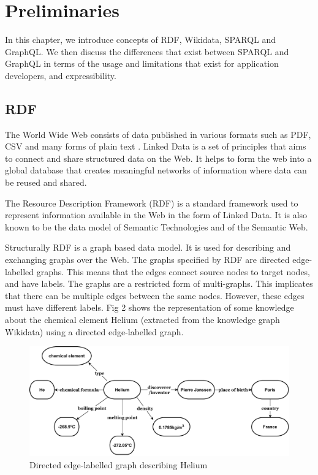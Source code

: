 \chapter{Preliminaries}
In this chapter, we introduce concepts of RDF, Wikidata, SPARQL and GraphQL. We then discuss the differences that exist between SPARQL and GraphQL in terms of the usage and limitations that exist for application developers, and expressibility.

\section{RDF}
The World Wide Web consists of data published in various formats such as PDF, CSV and many forms of plain text \cite{Ruth2013}. Linked Data is a set of principles that aims to connect and share structured data on the Web. It helps to form the web into a global database that creates meaningful networks of information where data can be reused and shared. 

The Resource Description Framework (RDF) is a standard framework used to represent information available in the Web in the form of Linked Data. It is also known to be the data model of Semantic Technologies and of the Semantic Web. 

Structurally RDF is a graph based data model. It is used for describing and exchanging graphs over the Web. The graphs specified by RDF are directed edge-labelled graphs. This means that the edges connect source nodes to target nodes, and have labels. The graphs are a restricted form of multi-graphs. This implicates that there can be multiple edges between the same nodes. However, these edges must have different labels. Fig 2 shows the representation of some knowledge about the chemical element Helium (extracted from the knowledge graph Wikidata) using a directed edge-labelled graph. 

\begin{figure}[h]
  \centering
  \includegraphics[width=0.80\linewidth]{images/del_graph.drawio.pdf}
  \caption{Directed edge-labelled graph describing Helium}
  \label{fig:figure 1}
\end{figure}

